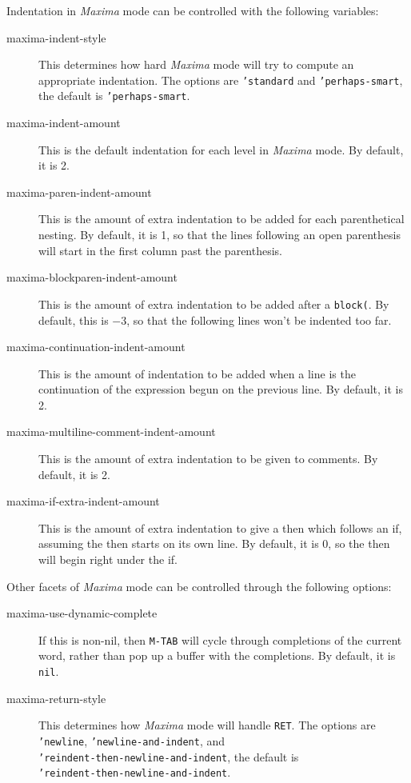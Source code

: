\documentclass{article}
\newcommand{\mx}{\textsl{\sffamily Maxima}}
\begin{document}
Indentation in \mx{} mode can be controlled with the following
variables:
\begin{description}
\item[maxima-indent-style] This determines how hard \mx{} mode will
  try to compute an appropriate indentation.  The options are 
  \texttt{'standard} and \texttt{'perhaps-smart}, the default is
  \texttt{'perhaps-smart}.
\item[maxima-indent-amount] This is the default indentation for each
  level in \mx{} mode.  By default, it is 2.
\item[maxima-paren-indent-amount] This is the amount of extra
  indentation to be added for each parenthetical nesting.  By default,
  it is 1, so that the lines following an open parenthesis will start
  in the first column past the parenthesis.
\item[maxima-blockparen-indent-amount] This is the amount of extra
  indentation to be added after a \texttt{block(}.  By default, this
  is $-3$, so that the following lines won't be indented too far.
\item[maxima-continuation-indent-amount] This is the amount of
  indentation to be added when a line is the continuation of the
  expression begun on the previous line.  By default, it is 2.
\item[maxima-multiline-comment-indent-amount] This is the amount of
  extra indentation to be given to comments.  By default, it is 2.
\item[maxima-if-extra-indent-amount] This is the amount of extra
  indentation to give a then which follows an if, assuming the then
  starts on its own line.  By default, it is 0, so the then will begin
  right under the if.
\end{description}

Other facets of \mx{} mode can be controlled through the following
options: 
\begin{description}
\item[maxima-use-dynamic-complete] If this is non-nil, then
  \texttt{M-TAB} will cycle through completions of the current word,
  rather than pop up a buffer with the completions.  By default, it is
  \texttt{nil}.
\item[maxima-return-style] This determines how \mx{} mode will handle
  \texttt{RET}.  The options are \texttt{'newline},
  \texttt{'newline-and-indent}, and\\
  \texttt{'reindent-then-newline-and-indent}, the default is\\
  \texttt{'reindent-then-newline-and-indent}.
\end{description}
\end{document}
